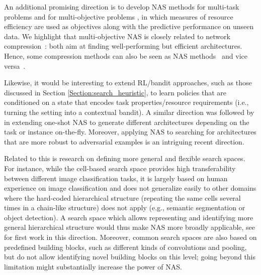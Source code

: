 \documentclass[twoside,11pt]{article}
\renewcommand{\cite}[1]{\citep{#1}}
\begin{document}
An additional promising direction is to develop NAS methods for multi-task problems \cite{liang_evolutionary_2018, meyerson_pseudo-task_2018} and for multi-objective problems \cite{elsken_multi_2018, dong_dpp_net_2018,zhou_renas}, in which measures of resource efficiency are used as objectives along with the predictive performance on unseen data. %
We highlight that multi-objective NAS is closely related to network compression~\citep{han_compression,cheng_compression}: both aim at finding well-performing but efficient architectures. Hence, some compression methods can also be seen as NAS methods~\citep{NIPS2015_5784, Liu2017LearningEC,Gordon_2018_CVPR,liu2018rethinking,cao2018learnable} and vice versa~\citep{DBLP:journals/corr/SaxenaV16,liu_darts,xie2018snas}. %

Likewise, it would be interesting to extend RL/bandit approaches, such as those discussed in Section \ref{Section:search_heuristic}, to learn policies that are conditioned on a state that encodes task properties/resource requirements (i.e., turning the setting into a contextual bandit). A similar direction was followed by \citet{ramachandran_dynamic_2018} in extending one-shot NAS to generate different architectures depending on the task or instance on-the-fly. Moreover, applying NAS to searching for architectures that are more robust to adversarial examples \cite{cubuk_intriguing_2017} is an intriguing recent direction.

Related to this is research on defining more general and flexible search spaces. For instance, while the cell-based search space provides high transferability between different image classification tasks, it is largely based on human experience on image classification and does not generalize easily to other domains where the hard-coded hierarchical structure (repeating the same cells several times in a chain-like structure) does not apply (e.g., semantic segmentation or object detection). A search space which allows representing and identifying more general hierarchical structure would thus make NAS more broadly applicable, see \citet{liu_hierarchical_2017,liu_autodeeplab} for first work in this direction. Moreover, common search spaces are also based on predefined building blocks, such as different kinds of convolutions and pooling, but do not allow identifying novel building blocks on this level; going beyond this limitation might substantially increase the power of NAS.
\end{document}

